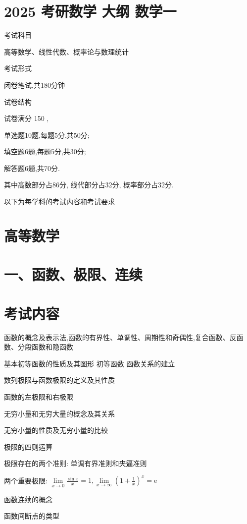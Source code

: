 \documentclass[10pt]{article}
\begin{document}
\section*{2025 考研数学 大纲 数学一}

考试科目

高等数学、线性代数、概率论与数理统计

考试形式

闭卷笔试,共180分钟

试卷结构

试卷满分 150 ,

单选题10题,每题5分,共50分;

填空题6题,每题5分,共30分;

解答题6题,共70分.

其中高数部分占86分, 线代部分占32分, 概率部分占32分.

以下为每学科的考试内容和考试要求

\section*{高等数学}

\section*{一、函数、极限、连续}

\section*{考试内容}

函数的概念及表示法,函数的有界性、单调性、周期性和奇偶性,复合函数、反函数、分段函数和隐函数 

基本初等函数的性质及其图形 初等函数 函数关系的建立

数列极限与函数极限的定义及其性质 

函数的左极限和右极限 

无穷小量和无穷大量的概念及其关系 

无穷小量的性质及无穷小量的比较 

极限的四则运算 

极限存在的两个准则: 单调有界准则和夹逼准则 

两个重要极限: 
\(\mathop{\lim }\limits_{{x \rightarrow  0}}\frac{\sin x}{x} = 1,\mathop{\lim }\limits_{{x \rightarrow  \infty }}{\left( 1 + \frac{1}{x}\right) }^{x} = \mathrm{e}\)

函数连续的概念 

函数间断点的类型 
\end{document}
